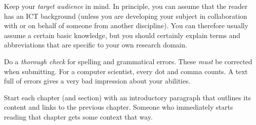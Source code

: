 

%

Keep your \emph{target audience} in mind. In principle, you can assume that the reader has an ICT background (unless you are developing your subject in collaboration with or on behalf of someone from another discipline). You can therefore usually assume a certain basic knowledge, but you should certainly explain terms and abbreviations that are specific to your own research domain.

Do a \emph{thorough check} for spelling and grammatical errors. These \emph{must} be corrected when submitting. For a computer scientist, every dot and comma counts. A text full of errors gives a very bad impression about your abilities.

Start each chapter (and section) with an introductory paragraph that outlines its content and links to the previous chapter. Someone who immediately starts reading that chapter gets some context that way.




%



